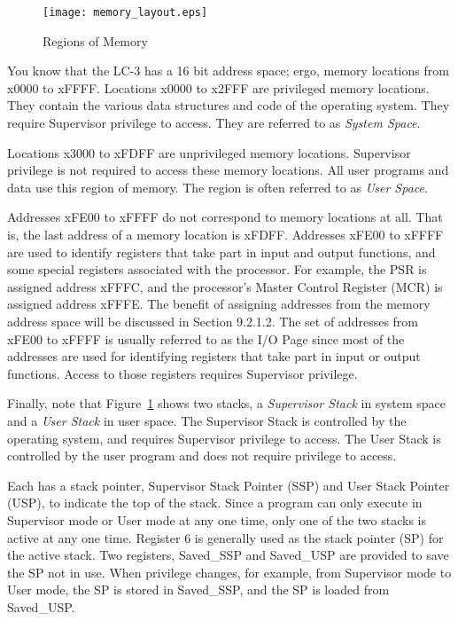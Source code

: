 \documentclass{patt}
\begin{document}
\begin{figure}[h!]
\centerline{\texttt{[image: memory\_layout.eps]}}
\caption{Regions of Memory}
\label{fig:memory_layout}
\end{figure}

You know that the LC-3 has a 16 bit address space; ergo, memory locations
from x0000 to xFFFF.  Locations x0000 to x2FFF are privileged memory
locations.  They contain the various data structures and code of the operating
system.  They require Supervisor privilege to access.  They are referred to as
{\em System Space}.

Locations x3000 to xFDFF are unprivileged memory locations.  Supervisor 
privilege is not required to access these memory locations.  All user programs 
and data use this region of memory.  The region is often referred to as 
{\em User Space}.

Addresses xFE00 to xFFFF do not correspond to memory locations at all.  
That is, the last address of a memory location is xFDFF. Addresses xFE00
to xFFFF are used to identify registers that take part in input and output
functions, and some special registers associated with the processor.  
For example, the PSR is assigned address xFFFC, and the processor's Master 
Control Register (MCR) is assigned address xFFFE.  The benefit of assigning
addresses from the memory address space will be discussed in Section 9.2.1.2.
The set of addresses from xFE00 to xFFFF is usually referred to as the I/O Page
since most of the addresses are used for identifying registers that take part 
in input or output functions.  Access to those registers requires 
Supervisor privilege.

Finally, note that Figure~\ref{fig:memory_layout} shows two stacks, a 
{\em Supervisor Stack} in system space and a {\em User Stack} in user space.  
The Supervisor Stack is controlled by the operating system, and requires 
Supervisor privilege to access.  The User Stack is controlled by the 
user program and does not require privilege to access.  

Each has a stack pointer, Supervisor Stack Pointer (SSP) and User Stack Pointer
(USP), to indicate the top of the stack.  Since a program can only execute
in Supervisor mode or User mode at any one time, only one of the two stacks
is active at any one time.  Register 6 is generally used as the 
stack pointer (SP) for the active stack.  Two registers, Saved\_SSP and 
Saved\_USP are provided to save the SP not in use.  When privilege changes,
for example, from Supervisor mode to User mode, the SP is stored in 
Saved\_SSP, and the SP is loaded from Saved\_USP.
\end{document}
